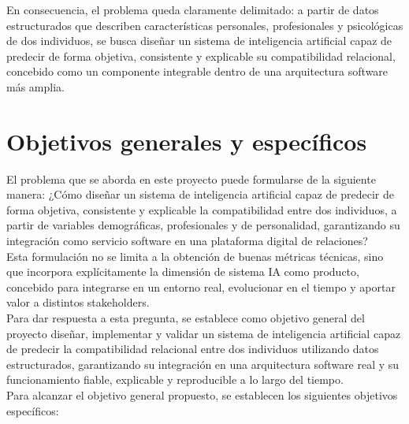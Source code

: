 En consecuencia, el problema queda claramente delimitado: a partir de datos estructurados que describen características personales, profesionales y psicológicas de dos individuos, se busca diseñar un sistema de inteligencia artificial capaz de predecir de forma objetiva, consistente y explicable su compatibilidad relacional, concebido como un componente integrable dentro de una arquitectura software más amplia.

\section{Objetivos generales y específicos}

El problema que se aborda en este proyecto puede formularse de la siguiente manera: ¿Cómo diseñar un sistema de inteligencia artificial capaz de predecir de forma objetiva, consistente y explicable la compatibilidad entre dos individuos, a partir de variables demográficas, profesionales y de personalidad, garantizando su integración como servicio software en una plataforma digital de relaciones?\\

Esta formulación no se limita a la obtención de buenas métricas técnicas, sino que incorpora explícitamente la dimensión de sistema IA como producto, concebido para integrarse en un entorno real, evolucionar en el tiempo y aportar valor a distintos stakeholders.\\

Para dar respuesta a esta pregunta, se establece como objetivo general del proyecto diseñar, implementar y validar un sistema de inteligencia artificial capaz de predecir la compatibilidad relacional entre dos individuos utilizando datos estructurados, garantizando su integración en una arquitectura software real y su funcionamiento fiable, explicable y reproducible a lo largo del tiempo.\\

Para alcanzar el objetivo general propuesto, se establecen los siguientes objetivos específicos:

